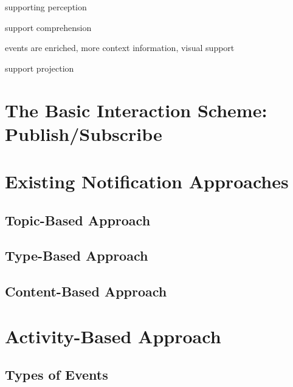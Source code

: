 supporting perception

support comprehension

events are enriched, more context information, visual support

support projection

\section{The Basic Interaction Scheme: Publish/Subscribe} %
\label{sec:the_basic_interaction_scheme_publish_subscribe}


\section{Existing Notification Approaches} %
\label{sec:existing_notification_approaches}
\subsection{Topic-Based Approach} %
\label{sub:topic_based_approach}


\subsection{Type-Based Approach} %
\label{sub:type_based_approach}


\subsection{Content-Based Approach} %
\label{sub:content_based_approach}



\section{Activity-Based Approach} %
\label{sec:activity_based_approach}
\subsection{Types of Events} %
\label{sub:types_of_events}
